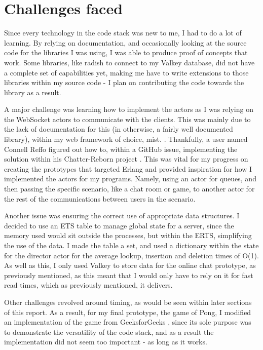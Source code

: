 \documentclass[]{final}
\begin{document}

\section{Challenges faced}

Since every technology in the code stack was new to me, I had to do a lot of learning.
By relying on documentation, and occasionally looking at the source code for
the libraries I was using, I was able to produce proof of concepts that work.
Some libraries, like radish to connect to my Valkey database, did not have
a complete set of capabilities yet, making me have to write extensions to those
libraries within my source code - I plan on contributing the code towards the
library as a result. %

A major challenge was learning how to implement the actors as I was relying on
the WebSocket actors to communicate with the clients. This was mainly due to the
lack of documentation for this (in otherwise, a fairly well documented library),
within my web framework of choice, mist. \cite{noauthor_example_nodate}.
Thankfully, a user named Connell Reffo figured out how to, within a GitHub issue,
implementing the solution within his Chatter-Reborn project \cite{reffo_connellr023/chatter-reborn_2024}.
This was vital for my progress on creating the prototypes that targeted Erlang and
provided inspiration for how I implemented the actors for my programs. Namely,
using an actor for queues, and then passing the specific scenario, like a chat
room or game, to another actor for the rest of the communications
between users in the scenario.

Another issue was ensuring the correct use of appropriate data structures.
I decided to use an ETS table to manage global state for a server, since the
memory used would sit outside the processes, but within the ERTS, simplifying
the use of the data. I made the table a set, and used a dictionary within the
state for the director actor for the average lookup, insertion and deletion
times of O(1). As well as this, I only used Valkey to store data for the
online chat prototype, as previously mentioned, as this meant that I would
only have to rely on it for fast read times, which as previously mentioned,
it delivers.%

Other challenges revolved around timing, as would be seen within later sections
of this report. As a result, for my final prototype, the game of Pong, I
modified an implementation of the game from GeeksforGeeks \cite{GeeksforGeeks_pong_2021}, since its sole
purpose was to demonstrate the versatility of the code stack, and as a result
the implementation did not seem too important - as long as it works.
\end{document}
